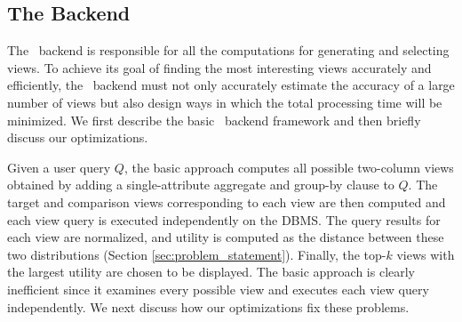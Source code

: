 \subsection{The Backend}
\label{subsec:VizRecDB_backend}

The \VizRecDB\ backend is responsible for all the computations for 
generating and selecting views. 
To achieve its goal of finding the most
interesting views accurately and efficiently, the \VizRecDB\ backend must not only accurately
estimate the accuracy of a large number of views but also design ways in which
the total processing time will be minimized.
We first describe the basic \VizRecDB\ backend framework and then briefly discuss our optimizations.


Given a user query $Q$, the basic approach computes all
possible two-column views obtained by adding a single-attribute aggregate and group-by clause to $Q$. 
The target and comparison views corresponding to each view are then
computed and each view query is executed independently on the DBMS. The query
results for each view are normalized, and utility is computed as the
distance between these two distributions (Section \ref{sec:problem_statement}).
Finally, the top-$k$ views with the largest utility are chosen to be displayed. 
The basic approach is clearly inefficient
since it examines every possible view 
and executes each view query independently.
We next discuss how our optimizations fix these problems.

